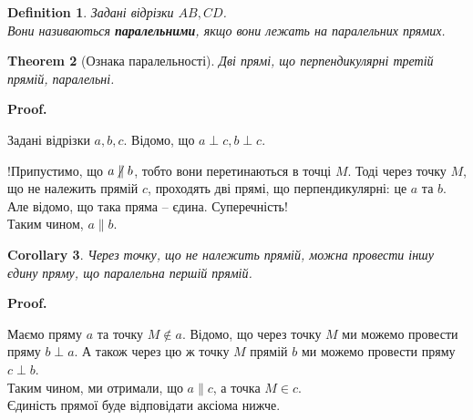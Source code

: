 \documentclass[a4paper, 10pt]{article}
\makeatletter
\theoremstyle{theoremdd}
\newtheorem{theorem}{Theorem}[subsection]
\theoremstyle{theoremdd}
\theoremstyle{theoremdd}
\newtheorem{definition}[theorem]{Definition}
\theoremstyle{theoremdd}
\theoremstyle{theoremdd}
\theoremstyle{theoremdd}
\theoremstyle{theoremdd}
\theoremstyle{theoremdd}
\theoremstyle{theoremdd}
\newtheorem{corollary}[theorem]{Corollary}
\renewenvironment{proof}[1][Proof.\\]{\par
\pushQED{\hfill \qed}%
\normalfont \topsep6\p@\@plus6\p@\relax
\trivlist
\item\relax
{\bfseries
#1\@addpunct{.}}\hspace\labelsep\ignorespaces
}{%
\popQED\endtrivlist\@endpefalse
}
\makeatother
\begin{document}
\begin{definition}
Задані відрізки $AB,CD$.\\
Вони називаються \textbf{паралельними}, якщо вони лежать на паралельних прямих.
\begin{figure}[H]
\centering
{}
\end{figure}
\end{definition}

\begin{theorem}[Ознака паралельності]
Дві прямі, що перпендикулярні третій прямій, паралельні.
\end{theorem}

\begin{proof}
Задані відрізки $a,b,c$. Відомо, що $a \perp c, b \perp c$.\\
\begin{figure}[H]
\centering
{}
\end{figure}
!Припустимо, що $a \centernot\parallel b$, тобто вони перетинаються в точці $M$. Тоді через точку $M$, що не належить прямій $c$, проходять дві прямі, що перпендикулярні: це $a$ та $b$. Але відомо, що така пряма -- єдина. Суперечність!\\
Таким чином, $a \parallel b$.
\end{proof}

\begin{corollary}
Через точку, що не належить прямій, можна провести іншу єдину пряму, що паралельна першій прямій.
\end{corollary}

\begin{proof}
Маємо пряму $a$ та точку $M \notin a$. Відомо, що через точку $M$ ми можемо провести пряму $b \perp a$. А також через цю ж точку $M$ прямій $b$ ми можемо провести пряму $c \perp b$.\\
Таким чином, ми отримали, що $a \parallel c$, а точка $M \in c$.\\
Єдиність прямої буде відповідати аксіома нижче.
\end{proof}
\end{document}
